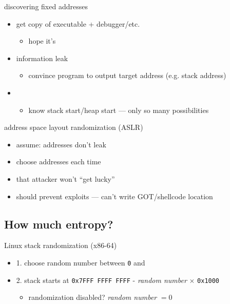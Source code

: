 \begin{frame}{discovering fixed addresses}
    \begin{itemize}
    \item get copy of executable + debugger/etc.
        \begin{itemize}
        \item hope it's 
        \end{itemize}
    \item information leak
        \begin{itemize}
        \item convince program to output target address (e.g. stack address)
        \end{itemize}
    \item {}
        \begin{itemize}
        \item know stack start/heap start --- only so many possibilities
        \end{itemize}
    \end{itemize}
\end{frame}

\begin{frame}{address space layout randomization (ASLR)}
    \begin{itemize}
    \item assume: addresses don't leak
    \item choose  addresses each time
    \item {} that attacker won't ``get lucky''
    \item should prevent exploits --- can't write GOT/shellcode location
    \end{itemize}
\end{frame}

\subsection{How much entropy?}

\begin{frame}{Linux stack randomization (x86-64)}
\begin{itemize}
    \item 1. choose random number between \texttt{0} and 
    \item 2. stack starts at \texttt{0x7FFF FFFF FFFF} - \textit{random number} $\times$ \texttt{0x1000}
        \begin{itemize}
        \item randomization disabled? \textit{random number} $= 0$
        \end{itemize}
\end{itemize}
\end{frame}

